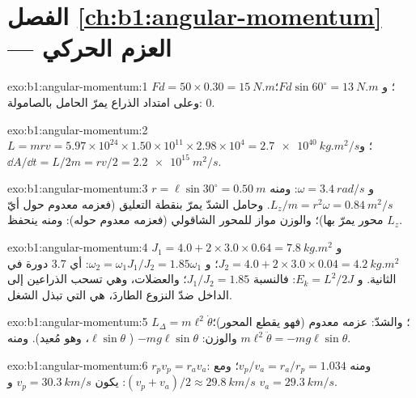 \section*{الفصل \ref{ch:b1:angular-momentum} --- العزم الحركي}

\begin{solution}{exo:b1:angular-momentum:1}
$Fd = 50 \times 0.30 = \qty{15}{N.m}$؛ و $Fd\sin 60^\circ = \qty{13}{N.m}$؛
وعلى امتداد الذراع يمرّ الحامل بالصامولة:  $0$.
\end{solution}

\begin{solution}{exo:b1:angular-momentum:2}
$L = mrv = 5.97\times10^{24} \times 1.50\times10^{11} \times 2.98\times10^4 =
\qty{2.7e40}{kg.m^2/s}$؛ و $\dd A/\dd t = L/2m = rv/2 = \qty{2.2e15}{m^2/s}$.
\end{solution}

\begin{solution}{exo:b1:angular-momentum:3}
$r = \ell\sin 30^\circ = \qty{0.50}{m}$ و $\omega = \qty{3.4}{rad/s}$:
ومنه $L_z/m = r^2\omega = \qty{0.84}{m^2/s}$. وحامل الشدّ
يمرّ بنقطة التعليق (فعزمه معدوم حول أيّ محور يمرّ بها)؛ والوزن
مواز للمحور الشاقولي (فعزمه معدوم حوله): ومنه ينحفظ $L_z$.
\end{solution}

\begin{solution}{exo:b1:angular-momentum:4}
$J_1 = 4.0 + 2 \times 3.0 \times 0.64 = \qty{7.8}{kg.m^2}$ و $J_2 = 4.0 +
2 \times 3.0 \times 0.04 = \qty{4.2}{kg.m^2}$؛ و $\omega_2 = \omega_1J_1/J_2 =
1.85\omega_1$: أي \qty{3.7}{} دورة في الثانية. و $E_k = L^2/2J$: فالنسبة
$J_1/J_2 = 1.85$؛ والعضلات، وهي تسحب الذراعين إلى الداخل ضدّ
النزوع الطاردَ، هي التي تبذل الشغل.
\end{solution}

\begin{solution}{exo:b1:angular-momentum:5}
$L_\Delta = m\ell^2\dot\theta$؛ والشدّ: عزمه معدوم (فهو يقطع المحور)؛
والوزن: $-mg\ell\sin\theta$ ( $\ell\sin\theta$، وهو مُعيد).
ومنه $m\ell^2\ddot\theta = -mg\ell\sin\theta$.
\end{solution}

\begin{solution}{exo:b1:angular-momentum:6}
$r_pv_p = r_av_a$: ومنه $v_p/v_a = r_a/r_p = 1.034$؛ ومع $(v_p + v_a)/2 \approx
\qty{29.8}{km/s}$: يكون $v_p = \qty{30.3}{km/s}$ و $v_a = \qty{29.3}{km/s}$.
\end{solution}

